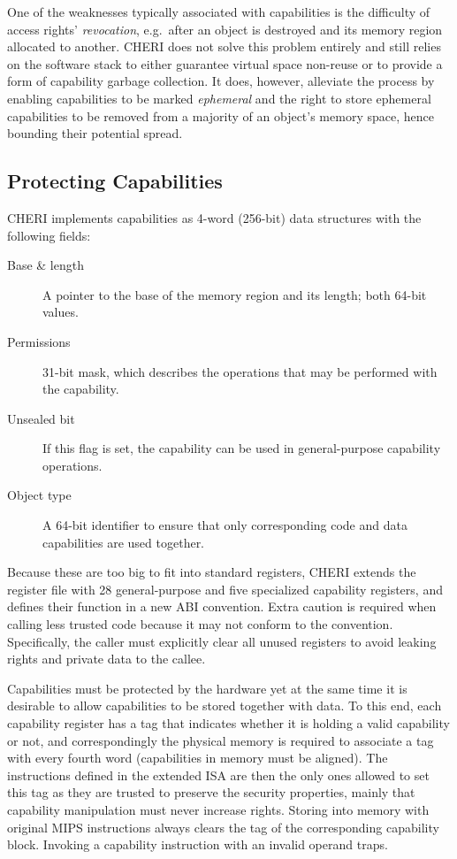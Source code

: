 \documentclass[a4paper,12pt,twoside,openright]{report}
\begin{document}
One of the weaknesses typically associated with capabilities is the difficulty of access rights' \emph{revocation}, e.g.\ after an object is destroyed and its memory region allocated to another. CHERI does not solve this problem entirely and still relies on the software stack to either guarantee virtual space non-reuse or to provide a form of capability garbage collection. It does, however, alleviate the process by enabling capabilities to be marked \emph{ephemeral} and the right to store ephemeral capabilities to be removed from a majority of an object's memory space, hence bounding their potential spread.

\subsection{Protecting Capabilities}

CHERI implements capabilities as 4-word (256-bit) data structures with the following fields:
\begin{description}
	\item[Base \& length] A pointer to the base of the memory region and its length; both 64-bit values.
	\item[Permissions] 31-bit mask, which describes the operations that may be performed with the capability.
	\item[Unsealed bit] If this flag is set, the capability can be used in general-purpose capability operations.
	\item[Object type] A 64-bit identifier to ensure that only corresponding code and data capabilities are used together.
\end{description}

Because these are too big to fit into standard registers, CHERI extends the register file with 28 general-purpose and five specialized capability registers, and defines their function in a new ABI convention. Extra caution is required when calling less trusted code because it may not conform to the convention. Specifically, the caller must explicitly clear all unused registers to avoid leaking rights and private data to the callee.

Capabilities must be protected by the hardware yet at the same time it is desirable to allow capabilities to be stored together with data. To this end, each capability register has a tag that indicates whether it is holding a valid capability or not, and correspondingly the physical memory is required to associate a tag with every fourth word (capabilities in memory must be aligned). The instructions defined in the extended ISA are then the only ones allowed to set this tag as they are trusted to preserve the security properties, mainly that capability manipulation must never increase rights. Storing into memory with original MIPS instructions always clears the tag of the corresponding capability block. Invoking a capability instruction with an invalid operand traps.
\end{document}
